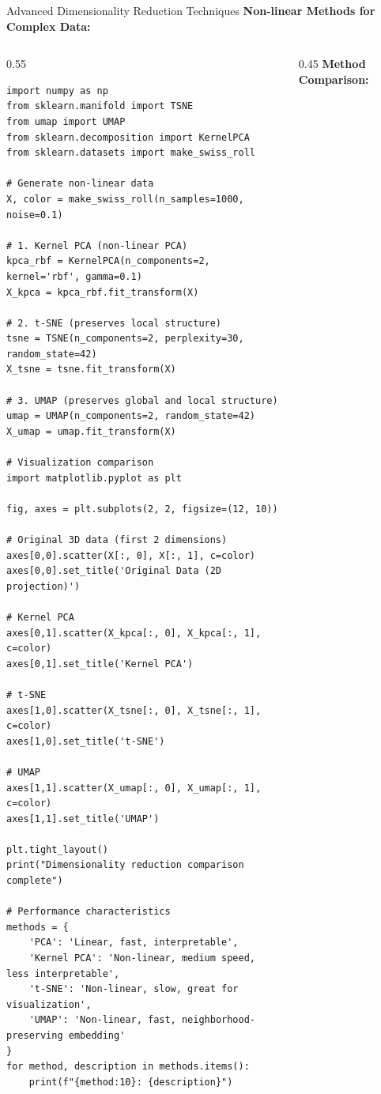 \documentclass[aspectratio=169,11pt]{beamer}
\begin{document}
\begin{frame}[fragile]{Advanced Dimensionality Reduction Techniques}
\textbf{Non-linear Methods for Complex Data:}

\begin{columns}
\begin{column}{0.55\textwidth}
\begin{lstlisting}
import numpy as np
from sklearn.manifold import TSNE
from umap import UMAP
from sklearn.decomposition import KernelPCA
from sklearn.datasets import make_swiss_roll

# Generate non-linear data
X, color = make_swiss_roll(n_samples=1000, noise=0.1)

# 1. Kernel PCA (non-linear PCA)
kpca_rbf = KernelPCA(n_components=2, kernel='rbf', gamma=0.1)
X_kpca = kpca_rbf.fit_transform(X)

# 2. t-SNE (preserves local structure)
tsne = TSNE(n_components=2, perplexity=30, random_state=42)
X_tsne = tsne.fit_transform(X)

# 3. UMAP (preserves global and local structure)
umap = UMAP(n_components=2, random_state=42)
X_umap = umap.fit_transform(X)

# Visualization comparison
import matplotlib.pyplot as plt

fig, axes = plt.subplots(2, 2, figsize=(12, 10))

# Original 3D data (first 2 dimensions)
axes[0,0].scatter(X[:, 0], X[:, 1], c=color)
axes[0,0].set_title('Original Data (2D projection)')

# Kernel PCA
axes[0,1].scatter(X_kpca[:, 0], X_kpca[:, 1], c=color)
axes[0,1].set_title('Kernel PCA')

# t-SNE
axes[1,0].scatter(X_tsne[:, 0], X_tsne[:, 1], c=color)
axes[1,0].set_title('t-SNE')

# UMAP
axes[1,1].scatter(X_umap[:, 0], X_umap[:, 1], c=color)
axes[1,1].set_title('UMAP')

plt.tight_layout()
print("Dimensionality reduction comparison complete")

# Performance characteristics
methods = {
    'PCA': 'Linear, fast, interpretable',
    'Kernel PCA': 'Non-linear, medium speed, less interpretable',
    't-SNE': 'Non-linear, slow, great for visualization',
    'UMAP': 'Non-linear, fast, neighborhood-preserving embedding'
}
for method, description in methods.items():
    print(f"{method:10}: {description}")
\end{lstlisting}
\end{column}
\begin{column}{0.45\textwidth}
\textbf{Method Comparison:}


\end{column}
\end{columns}
\end{frame}
\end{document}
